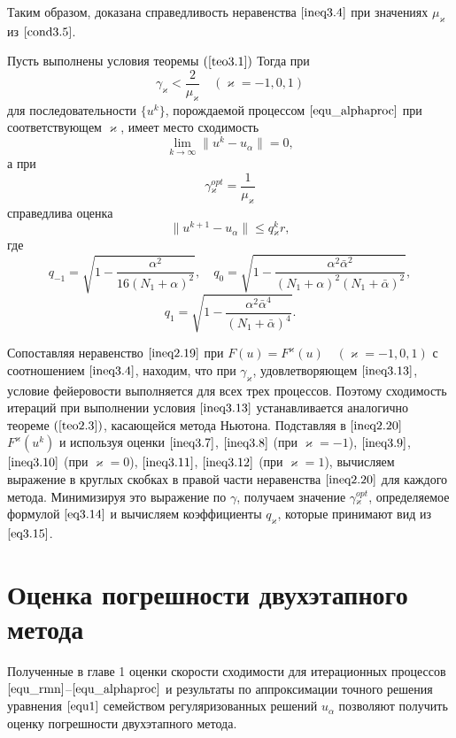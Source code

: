 Таким образом, доказана справедливость неравенства $\eqref{ineq3.4}$ при значениях $\mu_\varkappa$ из $\eqref{cond3.5}$.
\begin{theorem}\label{teo3.2}
	Пусть выполнены условия теоремы $(\ref{teo3.1})$ Тогда при
	\begin{equation}\label{ineq3.13}
	\gamma _\varkappa <\frac{2}{\mu _\varkappa}\quad (\varkappa=-1,0,1)
	\end{equation}
	для последовательности $\{u^k\}$, порождаемой процессом $\eqref{equ_alphaproc}$ при соответствующем $\varkappa$, имеет место сходимость $$\lim_{k\to\infty}\|u^k-u_\alpha\|=0,$$ а при 
	\begin{equation}\label{eq3.14}
	\gamma{_\varkappa^{opt}}=\frac{1}{\mu_\varkappa}
	\end{equation}
	справедлива оценка $$\|u^{k+1}-u_\alpha\|\le q{_\varkappa^k}r,$$ где
	$$q_{-1}=\sqrt{1-\frac{\alpha^2}{16(N_1+\alpha)^2}}, \quad q_0=\sqrt{1-\frac{\alpha^2\bar\alpha^2}{(N_1+\alpha)^2(N_1+\bar\alpha)^2}},$$
	\begin{equation}\label{eq3.15}
	q_1=\sqrt{1-\frac{\alpha^2\bar\alpha^4}{(N_1+\bar\alpha)^4}}.
	\end{equation}
\end{theorem}
\proof Сопоставляя неравенство $\eqref{ineq2.19}$ при $F(u)=F^\varkappa(u) \quad (\varkappa=-1,0,1)$ с соотношением $\eqref{ineq3.4}$, находим, что при $\gamma_\varkappa$, удовлетворяющем  $\eqref{ineq3.13}$, условие фейеровости выполняется для всех трех процессов. Поэтому сходимость итераций при выполнении условия $\eqref{ineq3.13}$ устанавливается аналогично теореме $(\ref{teo2.3})$, касающейся метода Ньютона. Подставляя в $\eqref{ineq2.20}$ $F^\varkappa(u^k)$ и используя оценки $\eqref{ineq3.7}$, $\eqref{ineq3.8}$ (при $\varkappa=-1$), $\eqref{ineq3.9}$, $\eqref{ineq3.10}$ (при $\varkappa=0$), $\eqref{ineq3.11}$, $\eqref{ineq3.12}$ (при $\varkappa=1$), вычисляем выражение в круглых скобках в правой части неравенства $\eqref{ineq2.20}$ для каждого метода. Минимизируя это выражение по $\gamma$, получаем значение $\gamma{_\varkappa^{opt}}$, определяемое формулой $\eqref{eq3.14}$ и вычисляем коэффициенты $q_\varkappa$, которые принимают вид из $\eqref{eq3.15}$.

\newpage
\section{Оценка погрешности двухэтапного метода}

Полученные в главе 1 оценки скорости сходимости для итерационных процессов $\eqref{equ_rmn}$--$\eqref{equ_alphaproc}$ и результаты по аппроксимации точного решения уравнения $\eqref{equ1}$ семейством регуляризованных решений $u_\alpha$ позволяют получить оценку погрешности двухэтапного метода.

